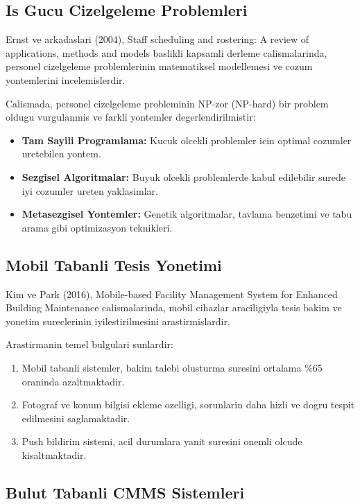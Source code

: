 \subsection{Is Gucu Cizelgeleme Problemleri}
\label{subsec:is-gucu-cizelgeleme}

Ernst ve arkadaslari (2004), Staff scheduling and rostering: A review 
of applications, methods and models baslikli kapsamli derleme 
calismalarinda, personel cizelgeleme problemlerinin matematiksel 
modellemesi ve cozum yontemlerini incelemislerdir.

Calismada, personel cizelgeleme probleminin NP-zor (NP-hard) bir 
problem oldugu vurgulanmis ve farkli yontemler degerlendirilmistir:

\begin{itemize}
    \item \textbf{Tam Sayili Programlama:} Kucuk olcekli problemler 
    icin optimal cozumler uretebilen yontem.
    \item \textbf{Sezgisel Algoritmalar:} Buyuk olcekli problemlerde 
    kabul edilebilir surede iyi cozumler ureten yaklasimlar.
    \item \textbf{Metasezgisel Yontemler:} Genetik algoritmalar, 
    tavlama benzetimi ve tabu arama gibi optimizasyon teknikleri.
\end{itemize}

\subsection{Mobil Tabanli Tesis Yonetimi}
\label{subsec:mobil-tesis-yonetimi}

Kim ve Park (2016), Mobile-based Facility Management System for 
Enhanced Building Maintenance calismalarinda, mobil cihazlar 
araciligiyla tesis bakim ve yonetim sureclerinin 
iyilestirilmesini arastirmislardir.

Arastirmanin temel bulgulari sunlardir:
\begin{enumerate}
    \item Mobil tabanli sistemler, bakim talebi olusturma suresini 
    ortalama \%65 oraninda azaltmaktadir.
    \item Fotograf ve konum bilgisi ekleme ozelligi, sorunlarin 
    daha hizli ve dogru tespit edilmesini saglamaktadir.
    \item Push bildirim sistemi, acil durumlara yanit suresini 
    onemli olcude kisaltmaktadir.
\end{enumerate}

\subsection{Bulut Tabanli CMMS Sistemleri}
\label{subsec:bulut-cmms}

